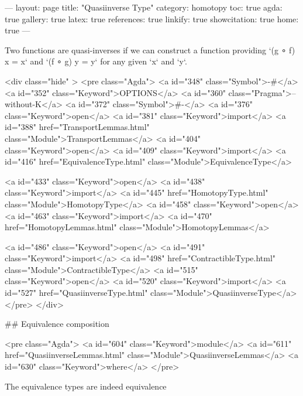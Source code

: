 ---
layout: page
title: "Quasiinverse Type"
category: homotopy
toc: true
agda: true
gallery: true
latex: true
references: true
linkify: true
showcitation: true
home: true
---

Two functions are quasi-inverses if we can construct a function providing
`(g ∘ f) x = x` and `(f ∘ g) y = y` for any given `x` and `y`.

<div class="hide" >
<pre class="Agda">
<a id="348" class="Symbol">{-#</a> <a id="352" class="Keyword">OPTIONS</a> <a id="360" class="Pragma">--without-K</a> <a id="372" class="Symbol">#-}</a>
<a id="376" class="Keyword">open</a> <a id="381" class="Keyword">import</a> <a id="388" href="TransportLemmas.html" class="Module">TransportLemmas</a>
<a id="404" class="Keyword">open</a> <a id="409" class="Keyword">import</a> <a id="416" href="EquivalenceType.html" class="Module">EquivalenceType</a>

<a id="433" class="Keyword">open</a> <a id="438" class="Keyword">import</a> <a id="445" href="HomotopyType.html" class="Module">HomotopyType</a>
<a id="458" class="Keyword">open</a> <a id="463" class="Keyword">import</a> <a id="470" href="HomotopyLemmas.html" class="Module">HomotopyLemmas</a>

<a id="486" class="Keyword">open</a> <a id="491" class="Keyword">import</a> <a id="498" href="ContractibleType.html" class="Module">ContractibleType</a>
<a id="515" class="Keyword">open</a> <a id="520" class="Keyword">import</a> <a id="527" href="QuasiinverseType.html" class="Module">QuasiinverseType</a>
</pre>
</div>

## Equivalence composition

<pre class="Agda">
<a id="604" class="Keyword">module</a> <a id="611" href="QuasiinverseLemmas.html" class="Module">QuasiinverseLemmas</a> <a id="630" class="Keyword">where</a>
</pre>

The equivalence types are indeed equivalence

